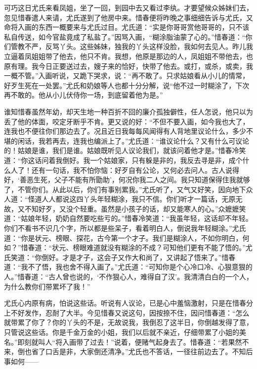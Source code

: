 可巧这日尤氏来看凤姐，坐了一回，到园中去又看过李纨。才要望候众姊妹们去，忽见惜春遣人来请，尤氏遂到了他房中来。惜春便将昨晚之事细细告诉与尤氏，又命将入画的东西一概要来与尤氏过目。尤氏道：``实是你哥哥赏他哥哥的，只不该私自传送，如今官盐竟成了私盐了。''因骂入画，``糊涂脂油蒙了心的。''惜春道：``你们管教不严，反骂丫头。这些姊妹，独我的丫头这样没脸，我如何去见人。昨儿我立逼着凤姐姐带了他去，他只不肯。我想，他原是那边的人，凤姐姐不带他去，也原有理。我今日正要送过去，嫂子来的恰好，快带了他去。或打，或杀，或卖，我一概不管。''入画听说，又跪下哭求，说：``再不敢了。只求姑娘看从小儿的情常，好歹生死在一处罢。''尤氏和奶娘等人也都十分分解，说``他不过一时糊涂了，下次再不敢的。他从小儿伏侍你一场，到底留着他为是。''

谁知惜春虽然年幼，却天生地一种百折不回的廉介孤独僻性，任人怎说，他只以为丢了他的体面，咬定牙断乎不肯。更又说的好：``不但不要入画，如今我也大了，连我也不便往你们那边去了。况且近日我每每风闻得有人背地里议论什么，多少不堪的闲话，我若再去，连我也编派上了。''尤氏道：``谁议论什么？又有什么可议论的！姑娘是谁，我们是谁。姑娘既听见人议论我们，就该问着他才是。''惜春冷笑道：``你这话问着我倒好。我一个姑娘家，只有躲是非的，我反去寻是非，成个什么人了！还有一句话，我不怕你恼：好歹自有公论，又何必去问人。古人说得好，`善恶生死，父子不能有所勖助'，何况你我二人之间。我只知道保得住我就够了，不管你们。从此以后，你们有事别累我。''尤氏听了，又气又好笑，因向地下众人道：``怪道人人都说这四丫头年轻糊涂，我只不信。你们听才一篇话，无原无故，又不知好歹，又没个轻重。虽然是小孩子的话，却又能寒人的心。''众嬷嬷笑道：``姑娘年轻，奶奶自然要吃些亏的。''惜春冷笑道：``我虽年轻，这话却不年轻。你们不看书不识几个字，所以都是些呆子，看着明白人，倒说我年轻糊涂。''尤氏道：``你是状元、榜眼、探花，古今第一个才子。我们是糊涂人，不如你明白，何如？''惜春道：``状元、榜眼难道就没有糊涂的不成？可知他们更有不能了悟的。''尤氏笑道：``你倒好。才是才子，这会子又作大和尚了，又讲起了悟来了。''惜春道：``我不了悟，我也舍不得入画了。''尤氏道：``可知你是个心冷口冷、心狠意狠的人。''惜春道：``古人曾也说的，`不作狠心人，难得自了汉'。我清清白白的一个人，为什么教你们带累坏了我！''

尤氏心内原有病，怕说这些话。听说有人议论，已是心中羞恼激射，只是在惜春分上不好发作，忍耐了大半。今见惜春又说这句，因按捺不住，因问惜春道：``怎么就带累了你了？你的丫头的不是，无故说我，我倒忍了这半日，你倒越发得了意，只管说这些话。你是千金万金的小姐，我们以后就不亲近，仔细带累了小姐的美名。''即刻就叫人``将入画带了过去！''说着，便赌气起身去了。惜春道：``若果然不来，倒也省了口舌是非，大家倒还清净。''尤氏也不答话，一径往前边去了。不知后事如何------

